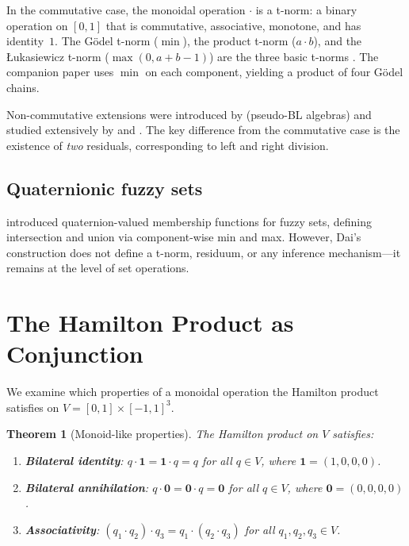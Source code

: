 \documentclass[11pt,a4paper]{article}
\newtheorem{theorem}{Theorem}
\begin{document}
In the commutative case, the monoidal operation $\cdot$ is a t-norm:
a binary operation on $[0,1]$ that is commutative, associative,
monotone, and has identity~$1$. The G\"odel t-norm ($\min$), the product
t-norm ($a \cdot b$), and the {\L}ukasiewicz t-norm
($\max(0, a + b - 1)$) are the three basic t-norms
\citep{hajek1998,esteva2001}. The companion paper \citet{p11} uses
$\min$ on each component, yielding a product of four G\"odel chains.

Non-commutative extensions were introduced by
\citet{hajek2003} (pseudo-BL algebras) and studied extensively by
\citet{ciungu2006} and \citet{galatos2007}. The key difference from the
commutative case is the existence of \emph{two} residuals, corresponding
to left and right division.

\subsection{Quaternionic fuzzy sets}

\citet{dai2023} introduced quaternion-valued membership functions for
fuzzy sets, defining intersection and union via component-wise min and
max. However, Dai's construction does not define a t-norm, residuum, or
any inference mechanism---it remains at the level of set operations.

\section{The Hamilton Product as Conjunction}
\label{sec:conjunction}

We examine which properties of a monoidal operation the Hamilton product
satisfies on $V = [0,1] \times [-1,1]^3$.

\begin{theorem}[Monoid-like properties]
\label{thm:monoid-properties}
The Hamilton product on $V$ satisfies:
\begin{enumerate}[nosep]
\item \textbf{Bilateral identity}: $q \cdot \mathbf{1} = \mathbf{1} \cdot q = q$
  for all $q \in V$, where $\mathbf{1} = (1, 0, 0, 0)$.
\item \textbf{Bilateral annihilation}: $q \cdot \mathbf{0} = \mathbf{0} \cdot q = \mathbf{0}$
  for all $q \in V$, where $\mathbf{0} = (0, 0, 0, 0)$.
\item \textbf{Associativity}: $(q_1 \cdot q_2) \cdot q_3 = q_1 \cdot (q_2 \cdot q_3)$
  for all $q_1, q_2, q_3 \in V$.
\end{enumerate}
\end{theorem}
\end{document}
